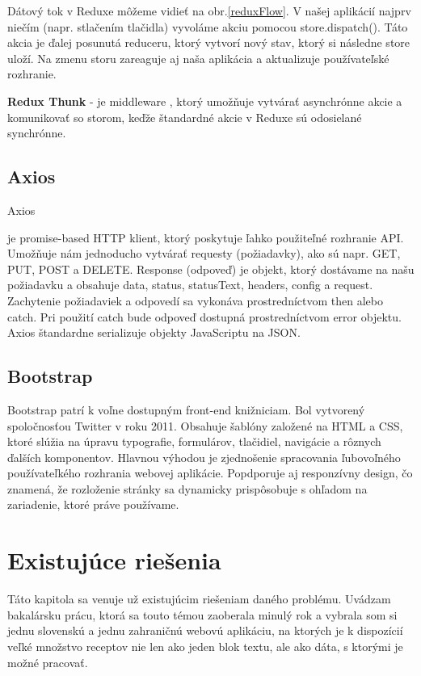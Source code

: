 Dátový tok v Reduxe môžeme vidieť na obr.\ref{reduxFlow}.
V našej aplikácií najprv niečím (napr. stlačením tlačidla) vyvoláme akciu pomocou store.dispatch(). Táto akcia je ďalej posunutá reduceru, ktorý vytvorí nový stav, ktorý si následne store uloží. Na zmenu storu zareaguje aj naša aplikácia a aktualizuje používateľské rozhranie.

\textbf{Redux Thunk} - je middleware {\cite{reduxThunk}}, ktorý umožňuje vytvárať asynchrónne akcie a komunikovať so storom, keďže štandardné akcie v Reduxe sú odosielané synchrónne.

\subsection{Axios}
Axios {\cite{axios} je promise-based HTTP klient, ktorý poskytuje ľahko použiteľné rozhranie API. Umožňuje nám jednoducho vytvárať requesty (požiadavky), ako sú napr. GET, PUT, POST a DELETE. Response (odpoveď) je objekt, ktorý dostávame na našu požiadavku a obsahuje data, status, statusText, headers, config a request. Zachytenie požiadaviek a odpovedí sa vykonáva prostredníctvom then alebo catch. Pri použití catch bude odpoveď dostupná prostredníctvom error objektu. Axios štandardne serializuje objekty JavaScriptu na JSON.

\subsection{Bootstrap}
Bootstrap {\cite{bootstrap}} patrí k voľne dostupným front-end knižniciam. Bol vytvorený spoločnosťou Twitter v roku 2011. Obsahuje šablóny založené na HTML a CSS, ktoré slúžia na úpravu typografie, formulárov, tlačidiel, navigácie a rôznych ďalších komponentov.  Hlavnou výhodou je zjednošenie spracovania ľubovoľného používateľkého rozhrania webovej aplikácie. Popdporuje aj responzívny design, čo znamená, že rozloženie stránky sa dynamicky prispôsobuje s ohľadom na zariadenie, ktoré práve používame.

\section{Existujúce riešenia} 
Táto kapitola sa venuje už existujúcim riešeniam daného problému. Uvádzam bakalársku prácu, ktorá sa touto témou zaoberala minulý rok a vybrala som si jednu slovenskú
a jednu zahraničnú webovú aplikáciu, na ktorých je k dispozícií veľké množstvo receptov nie len ako jeden blok textu, ale ako dáta, s ktorými je možné pracovať.

}
